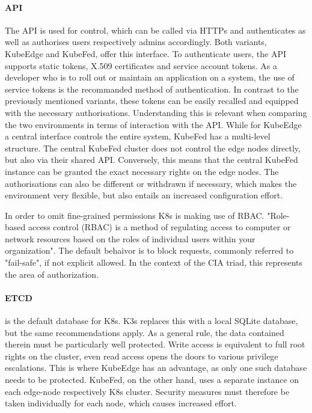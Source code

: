 \documentclass[MSC,Master,english]{twbook}%
\begin{document}
\paragraph{API} The API is used for control, which can be called via HTTPs and authenticates as well as authorises users respectively admins accordingly. Both variants, KubeEdge and KubeFed, offer this interface. To authenticate users, the API supports static tokens, X.509 certificates and service account tokens. As a developer who is to roll out or maintain an application on a system, the use of service tokens is the recommanded method of authentication. In contrast to the previously mentioned variants, these tokens can be easily recalled and equipped with the necessary authorisations\cite{owasp-k8s-cheat}. Understanding this is relevant when comparing the two environments in terms of interaction with the API. While for KubeEdge a central interface controls the entire system, KubeFed has a multi-level structure. The central KubeFed cluster does not control the edge nodes directly, but also via their shared API. Conversely, this means that the central KubeFed instance can be granted the exact necessary rights on the edge nodes. The authorisations can also be different or withdrawn if necessary, which makes the environment very flexible, but also entails an increased configuration effort.\par
In order to omit fine-grained permissions \ac{K8s} is making use of \ac{RBAC}. "Role-based access control (RBAC) is a method of regulating access to computer or network resources based on the roles of individual users within your organization"\cite{k8s-rbac}. The default behaivor is to block requests, commonly referred to "fail-safe", if not explicit allowed. In the context of the CIA triad, this represents the area of authorization.

\paragraph{ETCD} is the default database for \ac{K8s}. K3s replaces this with a local SQLite database, but the same recommendations apply\cite{k3s-config}. As a general rule, the data contained therein must be particularly well protected. Write access is equivalent to full root rights on the cluster, even read access opens the doors to various privilege escalations\cite{owasp-k8s-cheat}. This is where KubeEdge has an advantage, as only one such database needs to be protected. KubeFed, on the other hand, uses a separate instance on each edge-node respectively \ac{K8s} cluster. Security measures must therefore be taken individually for each node, which causes increased effort.
\end{document}
